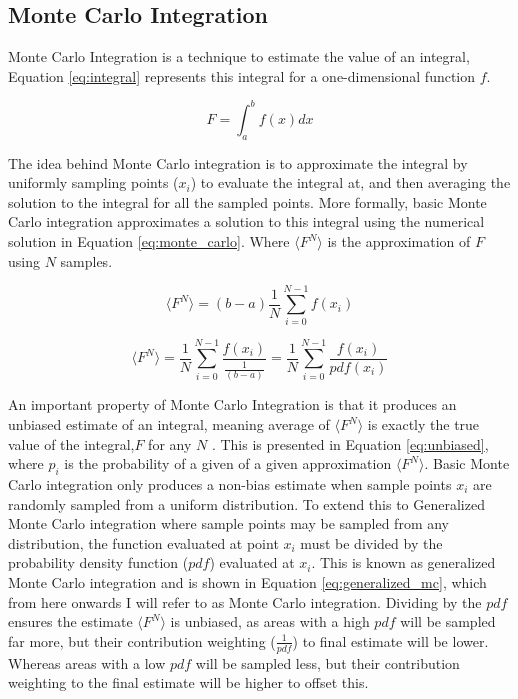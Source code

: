 \documentclass[ %
                    author={Callum Pearce},
                supervisor={Dr. Neill Campbell},
                    degree={MEng},
                     title={How effective are Temporal difference learning methods for reducing the number of zero contribution light paths, while still accurately approximating Global Illumination in Path tracing?},
                  subtitle={},
                      type={research},
                      year={2019} ]{dissertation}
\begin{document}
\subsection{Monte Carlo Integration}
\label{sec:monte_carlo_approx}
 Monte Carlo Integration is a technique to estimate the value of an integral, Equation \ref{eq:integral} represents this integral for a one-dimensional function $f$.

\begin{equation}
\label{eq:integral}
F = \int_a^b f(x) dx
\end{equation}

The idea behind Monte Carlo integration is to approximate the integral by uniformly sampling points ($x_i$) to evaluate the integral at, and then averaging the solution to the integral for all the sampled points. More formally, basic Monte Carlo integration approximates a solution to this integral using the numerical solution in Equation \ref{eq:monte_carlo}. Where $\langle F^N \rangle$ is the approximation of $F$ using $N$ samples.

\begin{equation}
\label{eq:monte_carlo}
\langle F^N \rangle = (b - a) \frac{1}{N} \sum^{N-1}_{i=0} f(x_i)
\end{equation}

\begin{equation}
\label{eq:generalized_mc}
\langle F^N \rangle = \frac{1}{N} \sum^{N-1}_{i=0} \frac{f(x_i)}{\frac{1}{(b-a)}} 
 = \frac{1}{N} \sum^{N-1}_{i=0} \frac{f(x_i)}{pdf(x_i)}
\end{equation}

An important property of Monte Carlo Integration is that it produces an unbiased estimate of an integral, meaning average of $\langle F^N \rangle$ is exactly the true value of the integral,$F$ for any $N$ \cite{morokoff1995quasi}. This is presented in Equation \ref{eq:unbiased}, where $p_i$ is the probability of a given of a given approximation $\langle F^N \rangle$. Basic Monte Carlo integration only produces a non-bias estimate when sample points $x_i$ are randomly sampled from a uniform distribution. To extend this to Generalized Monte Carlo integration where sample points may be sampled from any distribution, the function evaluated at point $x_i$ must be divided by the probability density function ($pdf$) evaluated at $x_i$. This is known as generalized Monte Carlo integration and is shown in Equation \ref{eq:generalized_mc}, which from here onwards I will refer to as Monte Carlo integration. Dividing by the $pdf$ ensures the estimate $\langle F^N \rangle$ is unbiased, as areas with a high $pdf$ will be sampled far more, but their contribution weighting ($\frac{1}{pdf}$) to final estimate will be lower. Whereas areas with a low $pdf$ will be sampled less, but their contribution weighting to the final estimate will be higher to offset this.
\end{document}
